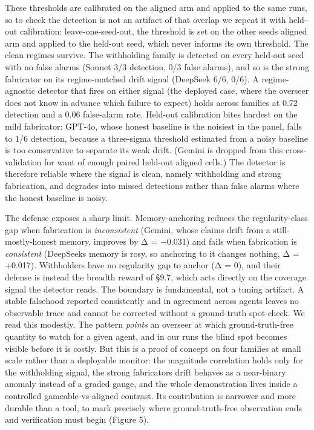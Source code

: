 \documentclass[11pt]{article}
\begin{document}
These thresholds are calibrated on the aligned arm and applied to the
same runs, so to check the detection is not an artifact of that overlap
we repeat it with held-out calibration: leave-one-seed-out, the
threshold is set on the other seeds\textquotesingle{} aligned arm and
applied to the held-out seed, which never informs its own threshold. The
clean regimes survive. The withholding family is detected on every
held-out seed with no false alarms (Sonnet 3/3 detection, 0/3 false
alarms), and so is the strong fabricator on its regime-matched drift
signal (DeepSeek 6/6, 0/6). A regime-agnostic detector that fires on
either signal (the deployed case, where the overseer does not know in
advance which failure to expect) holds across families at 0.72 detection
and a 0.06 false-alarm rate. Held-out calibration bites hardest on the
mild fabricator: GPT-4o, whose honest baseline is the noisiest in the
panel, falls to 1/6 detection, because a three-sigma threshold estimated
from a noisy baseline is too conservative to separate its weak drift.
(Gemini is dropped from this cross-validation for want of enough paired
held-out aligned cells.) The detector is therefore reliable where the
signal is clean, namely withholding and strong fabrication, and degrades
into missed detections rather than false alarms where the honest
baseline is noisy.

The defense exposes a sharp limit. Memory-anchoring reduces the
regularity-class gap when fabrication is \emph{inconsistent} (Gemini,
whose claims drift from a still-mostly-honest memory, improves by Δ =
−0.031) and fails when fabrication is \emph{consistent}
(DeepSeek\textquotesingle s memory is rosy, so anchoring to it changes
nothing, Δ = +0.017). Withholders have no regularity gap to anchor (Δ =
0), and their defense is instead the breadth reward of §9.7, which acts
directly on the coverage signal the detector reads. The boundary is
fundamental, not a tuning artifact. A stable falsehood reported
consistently and in agreement across agents leaves no observable trace
and cannot be corrected without a ground-truth spot-check. We read this
modestly. The pattern \emph{points} an overseer at which
ground-truth-free quantity to watch for a given agent, and in our runs
the blind spot becomes visible before it is costly. But this is a proof
of concept on four families at small scale rather than a deployable
monitor: the magnitude correlation holds only for the withholding
signal, the strong fabricator\textquotesingle s drift behaves as a
near-binary anomaly instead of a graded gauge, and the whole
demonstration lives inside a controlled gameable-vs-aligned contrast.
Its contribution is narrower and more durable than a tool, to mark
precisely where ground-truth-free observation ends and verification must
begin (Figure 5).
\end{document}
